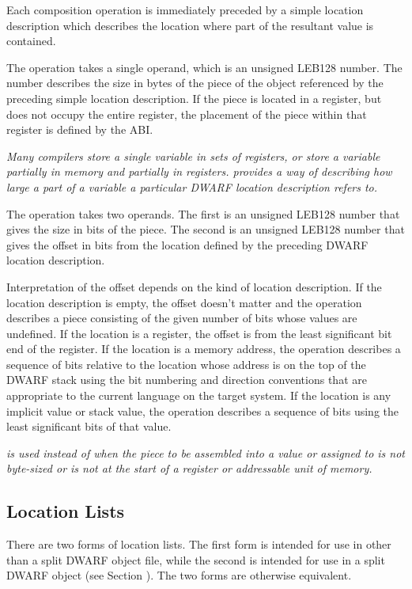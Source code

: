 Each composition operation is immediately preceded by a simple
location description which describes the location where part
of the resultant value is contained.
\begin{enumerate}[1. ]
\itembfnl{\DWOPpieceTARG}
The \DWOPpieceTARG{} operation takes a 
single operand, which is an
unsigned LEB128 number.  
The number describes the size in bytes
of the piece of the object referenced by the preceding simple
location description. If the piece is located in a register,
but does not occupy the entire register, the placement of
the piece within that register is defined by the ABI.

\textit{Many compilers store a single variable in sets of registers,
or store a variable partially in memory and partially in
registers. \DWOPpieceNAME{} provides a way of describing how large
a part of a variable a particular DWARF location description
refers to. }

\itembfnl{\DWOPbitpieceTARG}
The \DWOPbitpieceTARG{} 
operation takes two operands. The first
is an unsigned LEB128 
number that gives the size in bits
of the piece. The second is an 
unsigned LEB128 number that
gives the offset in bits from the location defined by the
preceding DWARF location description.  

Interpretation of the
offset depends on the kind of location description. If the
location description is empty, the offset doesn\textquoteright t matter and
the \DWOPbitpieceNAME{} operation describes a piece consisting
of the given number of bits whose values are undefined. If
the location is a register, the offset is from the least
significant bit end of the register. If the location is a
memory address, the \DWOPbitpieceNAME{} operation describes a
sequence of bits relative to the location whose address is
on the top of the DWARF stack using the bit numbering and
direction conventions that are appropriate to the current
language on the target system. If the location is any implicit
value or stack value, the \DWOPbitpieceNAME{} operation describes
a sequence of bits using the least significant bits of that
value.  
\end{enumerate}

\textit{\DWOPbitpieceNAME{} is 
used instead of \DWOPpieceNAME{} when
the piece to be assembled into a value or assigned to is not
byte-sized or is not at the start of a register or addressable
unit of memory.}

\subsection{Location Lists}
\label{chap:locationlists}
There are two forms of location lists. The first form 
is intended for use in other than a split DWARF object file,
while the second is intended for use in a split DWARF object
(see Section ). The two
forms are otherwise equivalent.


